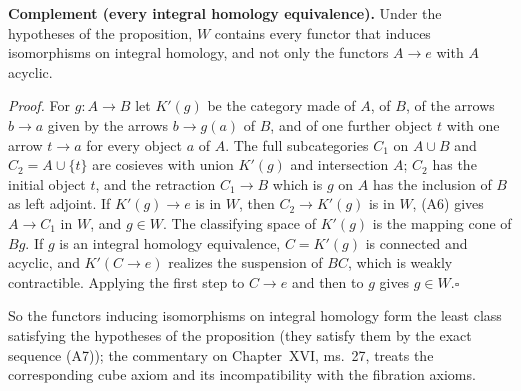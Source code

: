 \textbf{Complement (every integral homology equivalence).}\ours
Under the hypotheses of the proposition, $W$ contains every functor that induces isomorphisms on integral homology, and not only the functors $A\to e$ with $A$ acyclic.

\emph{Proof.}
For $g:A\to B$ let $K'(g)$ be the category made of $A$, of $B$, of the arrows $b\to a$ given by the arrows $b\to g(a)$ of $B$, and of one further object $t$ with one arrow $t\to a$ for every object $a$ of $A$. The full subcategories $C_1$ on $A\cup B$ and $C_2=A\cup\{t\}$ are cosieves with union $K'(g)$ and intersection $A$; $C_2$ has the initial object $t$, and the retraction $C_1\to B$ which is $g$ on $A$ has the inclusion of $B$ as left adjoint. If $K'(g)\to e$ is in $W$, then $C_2\to K'(g)$ is in $W$, (A6) gives $A\to C_1$ in $W$, and $g\in W$. The classifying space of $K'(g)$ is the mapping cone of $Bg$. If $g$ is an integral homology equivalence, $C=K'(g)$ is connected and acyclic, and $K'(C\to e)$ realizes the suspension of $BC$, which is weakly contractible. Applying the first step to $C\to e$ and then to $g$ gives $g\in W$.\hfill$\square$

So the functors inducing isomorphisms on integral homology form the least class satisfying the hypotheses of the proposition (they satisfy them by the exact sequence (A7)); the commentary on Chapter~XVI, ms.~27, treats the corresponding cube axiom and its incompatibility with the fibration axioms.
